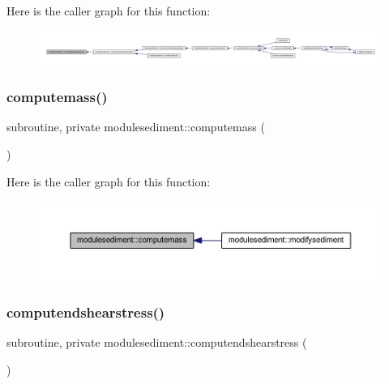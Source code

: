 Here is the caller graph for this function\+:\nopagebreak
\begin{figure}[H]
\begin{center}
\leavevmode
\includegraphics[width=350pt]{namespacemodulesediment_a03f094fcbc01dd75c60a5a69ce5dde19_icgraph}
\end{center}
\end{figure}
\mbox{\label{namespacemodulesediment_a38f45fc06e83e0a40fda99cfc71c39ce}} 
\subsubsection{\texorpdfstring{computemass()}{computemass()}}
{\footnotesize\ttfamily subroutine, private modulesediment\+::computemass (\begin{DoxyParamCaption}{ }\end{DoxyParamCaption})\hspace{0.3cm}{\ttfamily [private]}}

Here is the caller graph for this function\+:\nopagebreak
\begin{figure}[H]
\begin{center}
\leavevmode
\includegraphics[width=350pt]{namespacemodulesediment_a38f45fc06e83e0a40fda99cfc71c39ce_icgraph}
\end{center}
\end{figure}
\mbox{\label{namespacemodulesediment_a9d78e985794a27f527367cd42c5dafb2}} 
\subsubsection{\texorpdfstring{computendshearstress()}{computendshearstress()}}
{\footnotesize\ttfamily subroutine, private modulesediment\+::computendshearstress (\begin{DoxyParamCaption}{ }\end{DoxyParamCaption})\hspace{0.3cm}{\ttfamily [private]}}

